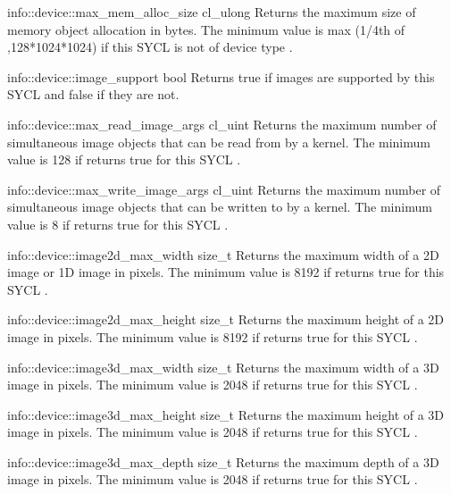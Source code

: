     \addInfoRow
     {info::device::max_mem_alloc_size}
     {cl_ulong}
     {
      Returns the maximum size of memory object allocation in  bytes. The minimum value is max (1/4th of ,128*1024*1024) if this SYCL  is not of device type .
     }

   \addInfoRow
     {info::device::image_support}
     {bool}
     {Returns true if images are supported by this SYCL  and false if they are not. }

   \addInfoRow
     {info::device::max_read_image_args}
     {cl_uint}
     {
      Returns the maximum number of simultaneous image objects that can be read from by a kernel. The minimum value is 128 if  returns true for this SYCL .
        }

   \addInfoRow
     {info::device::max_write_image_args}
     {cl_uint}
     {
    Returns the maximum number of simultaneous image objects that can be written to by a kernel. The minimum value is 8 if  returns true for this SYCL .
     }

   \addInfoRow
     {info::device::image2d_max_width}
     {size_t}
     {
    Returns the maximum width of a 2D image or 1D image in pixels. The minimum value is 8192 if  returns true for this SYCL .
     }

   \addInfoRow
     {info::device::image2d_max_height}
     {size_t}
     {
    Returns the maximum height of a 2D image in pixels. The minimum value is 8192 if  returns true for this SYCL .
     }

   \addInfoRow
     {info::device::image3d_max_width}
     {size_t}
     {
     Returns the maximum width of a 3D image in pixels. The minimum value is 2048 if  returns true for this SYCL .
     }

   \addInfoRow
     {info::device::image3d_max_height}
     {size_t}
     {
     Returns the maximum height of a 3D image in pixels. The minimum value is 2048 if  returns true for this SYCL .
     }

  \addInfoRow
  {info::device::image3d_max_depth}
  {size_t}
  {
    Returns the maximum depth of a 3D image in pixels. The minimum value is 2048 if  returns true for this SYCL .
  }
  
